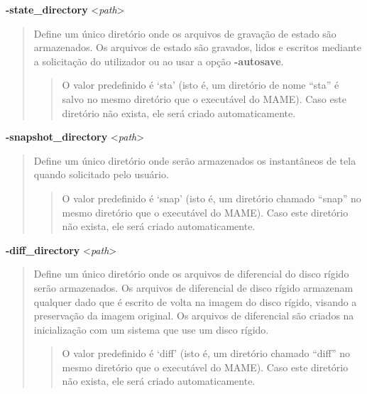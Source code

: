 \documentclass[letterpaper,10pt,brazil]{sphinxmanual}
\begin{document}
\label{commandline/commandline-all:mame-commandline-statedirectory}
\textbf{-state\_directory} \textless{}\emph{path}\textgreater{}
\begin{quote}

Define um único diretório onde os arquivos de gravação de estado
são armazenados. Os arquivos de estado são gravados, lidos e
escritos mediante a solicitação do utilizador ou ao usar a opção
\textbf{-autosave}.
\begin{quote}

O valor predefinido é `sta' (isto é, um diretório de nome ``sta''
é salvo no mesmo diretório que o executável do MAME).
Caso este diretório não exista, ele será criado automaticamente.
\end{quote}
\end{quote}
\label{commandline/commandline-all:mame-commandline-snapshotdirectory}
\textbf{-snapshot\_directory} \textless{}\emph{path}\textgreater{}
\begin{quote}

Define um único diretório onde serão armazenados os instantâneos de
tela quando solicitado pelo usuário.
\begin{quote}

O valor predefinido é `snap' (isto é, um diretório chamado
``snap'' no mesmo diretório que o executável do MAME). Caso este
diretório não exista, ele será criado automaticamente.
\end{quote}
\end{quote}
\label{commandline/commandline-all:mame-commandline-diffdirectory}
\textbf{-diff\_directory} \textless{}\emph{path}\textgreater{}
\begin{quote}

Define um único diretório onde os arquivos de diferencial do disco
rígido serão armazenados. Os arquivos de diferencial de disco rígido
armazenam qualquer dado que é escrito de volta na imagem do disco
rígido, visando a preservação da imagem original. Os arquivos de
diferencial são criados na inicialização com um sistema que use um
disco rígido.
\begin{quote}

O valor predefinido é `diff' (isto é, um diretório chamado
``diff'' no mesmo diretório que o executável do MAME). Caso este
diretório não exista, ele será criado automaticamente.
\end{quote}
\end{quote}
\label{commandline/commandline-all:mame-commandline-commentdirectory}
\end{document}
